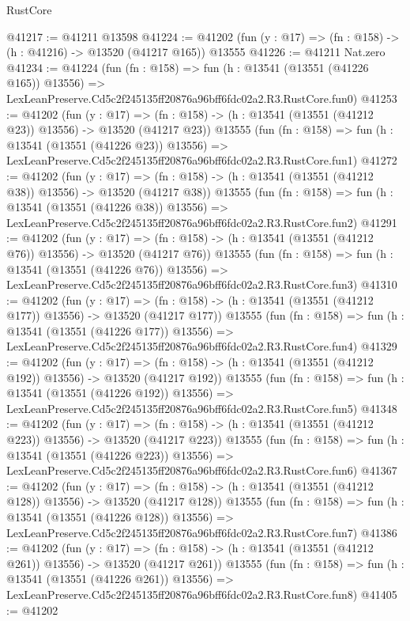 \begin{lexlean}{RustCore}
\begin{coremodule}
@41217 := @41211 @13598
@41224 := @41202 (fun (y : @17) => (fn : @158) -> (h : @41216) -> @13520 (@41217 @165)) @13555
@41226 := @41211 Nat.zero
@41234 := @41224
    (fun (fn : @158) =>
    fun (h : @13541 (@13551 (@41226 @165)) @13556) =>
    LexLeanPreserve.Cd5c2f245135ff20876a96bff6fdc02a2.R3.RustCore.fun0)
@41253 := @41202
    (fun (y : @17) =>
    (fn : @158) -> (h : @13541 (@13551 (@41212 @23)) @13556) -> @13520 (@41217 @23))
    @13555
    (fun (fn : @158) =>
    fun (h : @13541 (@13551 (@41226 @23)) @13556) =>
    LexLeanPreserve.Cd5c2f245135ff20876a96bff6fdc02a2.R3.RustCore.fun1)
@41272 := @41202
    (fun (y : @17) =>
    (fn : @158) -> (h : @13541 (@13551 (@41212 @38)) @13556) -> @13520 (@41217 @38))
    @13555
    (fun (fn : @158) =>
    fun (h : @13541 (@13551 (@41226 @38)) @13556) =>
    LexLeanPreserve.Cd5c2f245135ff20876a96bff6fdc02a2.R3.RustCore.fun2)
@41291 := @41202
    (fun (y : @17) =>
    (fn : @158) -> (h : @13541 (@13551 (@41212 @76)) @13556) -> @13520 (@41217 @76))
    @13555
    (fun (fn : @158) =>
    fun (h : @13541 (@13551 (@41226 @76)) @13556) =>
    LexLeanPreserve.Cd5c2f245135ff20876a96bff6fdc02a2.R3.RustCore.fun3)
@41310 := @41202
    (fun (y : @17) =>
    (fn : @158) -> (h : @13541 (@13551 (@41212 @177)) @13556) -> @13520 (@41217 @177))
    @13555
    (fun (fn : @158) =>
    fun (h : @13541 (@13551 (@41226 @177)) @13556) =>
    LexLeanPreserve.Cd5c2f245135ff20876a96bff6fdc02a2.R3.RustCore.fun4)
@41329 := @41202
    (fun (y : @17) =>
    (fn : @158) -> (h : @13541 (@13551 (@41212 @192)) @13556) -> @13520 (@41217 @192))
    @13555
    (fun (fn : @158) =>
    fun (h : @13541 (@13551 (@41226 @192)) @13556) =>
    LexLeanPreserve.Cd5c2f245135ff20876a96bff6fdc02a2.R3.RustCore.fun5)
@41348 := @41202
    (fun (y : @17) =>
    (fn : @158) -> (h : @13541 (@13551 (@41212 @223)) @13556) -> @13520 (@41217 @223))
    @13555
    (fun (fn : @158) =>
    fun (h : @13541 (@13551 (@41226 @223)) @13556) =>
    LexLeanPreserve.Cd5c2f245135ff20876a96bff6fdc02a2.R3.RustCore.fun6)
@41367 := @41202
    (fun (y : @17) =>
    (fn : @158) -> (h : @13541 (@13551 (@41212 @128)) @13556) -> @13520 (@41217 @128))
    @13555
    (fun (fn : @158) =>
    fun (h : @13541 (@13551 (@41226 @128)) @13556) =>
    LexLeanPreserve.Cd5c2f245135ff20876a96bff6fdc02a2.R3.RustCore.fun7)
@41386 := @41202
    (fun (y : @17) =>
    (fn : @158) -> (h : @13541 (@13551 (@41212 @261)) @13556) -> @13520 (@41217 @261))
    @13555
    (fun (fn : @158) =>
    fun (h : @13541 (@13551 (@41226 @261)) @13556) =>
    LexLeanPreserve.Cd5c2f245135ff20876a96bff6fdc02a2.R3.RustCore.fun8)
@41405 := @41202

\end{coremodule}
\end{lexlean}
